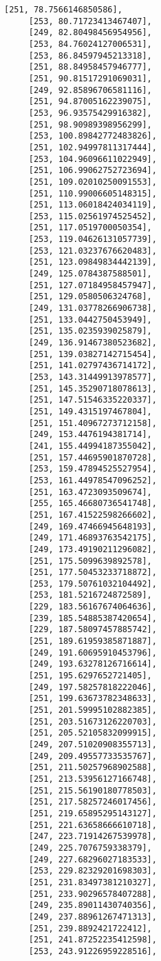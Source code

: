 \documentclass[11pt]{article}
\begin{document}
\begin{tcolorbox}[breakable, size=fbox, boxrule=.5pt, pad at break*=1mm, opacityfill=0]
\begin{Verbatim}[commandchars=\\\{\}]
     [251, 78.7566146850586],
     [253, 80.71723413467407],
     [249, 82.80498456954956],
     [253, 84.76024127006531],
     [253, 86.84597945213318],
     [251, 88.84958457946777],
     [251, 90.81517291069031],
     [249, 92.85896706581116],
     [251, 94.87005162239075],
     [253, 96.93575429916382],
     [251, 98.90989398956299],
     [253, 100.89842772483826],
     [251, 102.94997811317444],
     [253, 104.96096611022949],
     [251, 106.99062752723694],
     [251, 109.02010250091553],
     [251, 110.99006605148315],
     [251, 113.06018424034119],
     [253, 115.02561974525452],
     [251, 117.0519700050354],
     [253, 119.04626131057739],
     [253, 121.03237676620483],
     [251, 123.09849834442139],
     [249, 125.0784387588501],
     [251, 127.07184958457947],
     [251, 129.0580506324768],
     [249, 131.03778266906738],
     [251, 133.0442750453949],
     [251, 135.0235939025879],
     [249, 136.91467380523682],
     [251, 139.03827142715454],
     [251, 141.02797436714172],
     [253, 143.31449913978577],
     [251, 145.35290718078613],
     [251, 147.51546335220337],
     [251, 149.4315197467804],
     [251, 151.40967273712158],
     [249, 153.4476194381714],
     [241, 155.44994187355042],
     [251, 157.44695901870728],
     [253, 159.47894525527954],
     [253, 161.44978547096252],
     [251, 163.4723093509674],
     [255, 165.46680736541748],
     [251, 167.41522598266602],
     [249, 169.47466945648193],
     [249, 171.46893763542175],
     [249, 173.49190211296082],
     [251, 175.5099639892578],
     [251, 177.50453233718872],
     [253, 179.50761032104492],
     [253, 181.5216724872589],
     [229, 183.56167674064636],
     [239, 185.54885387420654],
     [229, 187.58097457885742],
     [251, 189.61959385871887],
     [249, 191.60695910453796],
     [249, 193.63278126716614],
     [251, 195.6297652721405],
     [249, 197.58257818222046],
     [251, 199.63673782348633],
     [251, 201.59995102882385],
     [251, 203.51673126220703],
     [251, 205.52105832099915],
     [249, 207.51020908355713],
     [249, 209.49557733535767],
     [251, 211.50257968902588],
     [251, 213.53956127166748],
     [251, 215.56190180778503],
     [251, 217.58257246017456],
     [251, 219.65895295143127],
     [251, 221.63658666610718],
     [247, 223.71914267539978],
     [249, 225.7076759338379],
     [249, 227.68296027183533],
     [253, 229.82329201698303],
     [251, 231.83497381210327],
     [251, 233.90296578407288],
     [249, 235.89011430740356],
     [249, 237.88961267471313],
     [251, 239.8892421722412],
     [251, 241.87252235412598],
     [253, 243.91226959228516],

\end{Verbatim}
\end{tcolorbox}
\end{document}

